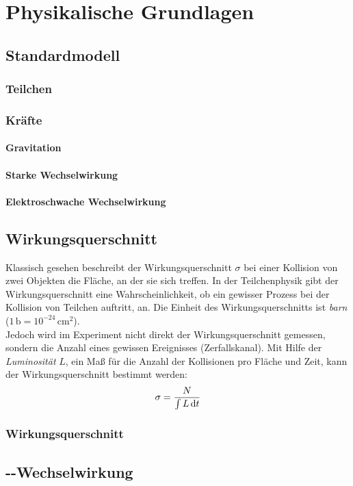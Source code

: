 \section{Physikalische Grundlagen}
\subsection{Standardmodell}
\subsubsection{Teilchen}
\subsubsection{Kräfte}
\paragraph{Gravitation}
\paragraph{Starke Wechselwirkung}
\paragraph{Elektroschwache Wechselwirkung}
\subsection{Wirkungsquerschnitt}
Klassisch gesehen beschreibt der Wirkungsquerschnitt $\sigma$ bei einer Kollision von zwei Objekten die Fläche, an der sie sich treffen. 
In der Teilchenphysik gibt der Wirkungsquerschnitt eine Wahrscheinlichkeit, ob ein gewisser Prozess bei der Kollision von Teilchen auftritt, an.
Die Einheit des Wirkungsquerschnitts ist \emph{barn} ($1\,\text{b} = 10^{-24}\,\text{cm}^2$). \\
Jedoch wird im Experiment nicht direkt der Wirkungsquerschnitt gemessen, sondern die Anzahl eines gewissen Ereignisses (Zerfallskanal). Mit Hilfe 
der \emph{Luminosität} $L$, ein Maß für die Anzahl der Kollisionen pro Fläche und Zeit, kann der Wirkungsquerschnitt bestimmt werden:
\begin{equation}
    \sigma = \frac{N}{\int L \, \mathrm{d} t}
\end{equation}
\subsubsection{Wirkungsquerschnitt }
\subsection{\texorpdfstring{\elp-\elm}{e+/e-}-Wechselwirkung}
